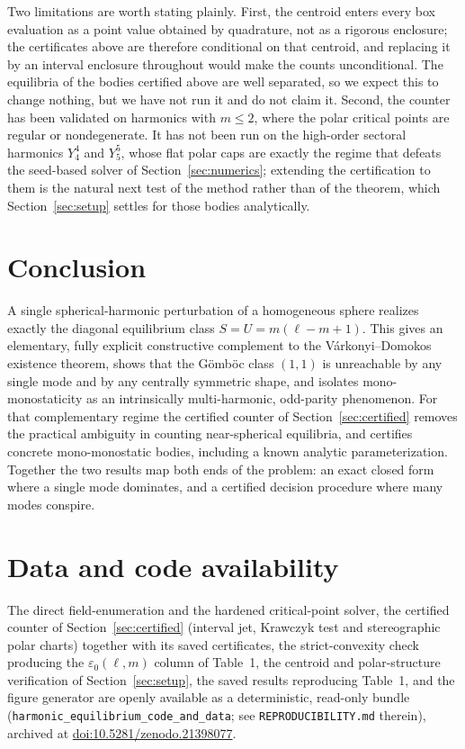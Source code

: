 \documentclass[11pt,a4paper]{article}
\theoremstyle{definition}
\begin{document}
Two limitations are worth stating plainly. First, the centroid enters every box evaluation as a point value
obtained by quadrature, not as a rigorous enclosure; the certificates above are therefore conditional on that
centroid, and replacing it by an interval enclosure throughout would make the counts unconditional. The
equilibria of the bodies certified above are well separated, so we expect this to change nothing, but we have
not run it and do not claim it. Second, the counter has been validated on harmonics with $m\le2$, where the
polar critical points are regular or nondegenerate. It has not been run on the high-order sectoral harmonics
$Y_4^4$ and $Y_5^5$, whose flat polar caps are exactly the regime that defeats the seed-based solver of
Section~\ref{sec:numerics}; extending the certification to them is the natural next test of the method rather
than of the theorem, which Section~\ref{sec:setup} settles for those bodies analytically.

\section{Conclusion}

A single spherical-harmonic perturbation of a homogeneous sphere realizes exactly the diagonal equilibrium
class $S=U=m(\ell-m+1)$. This gives an elementary, fully explicit constructive complement to the
V\'arkonyi--Domokos existence theorem, shows that the G\"omb\"oc class $(1,1)$ is unreachable by any single
mode and by any centrally symmetric shape, and isolates mono-monostaticity as an intrinsically
multi-harmonic, odd-parity phenomenon. For that complementary regime the certified counter of
Section~\ref{sec:certified} removes the practical ambiguity in counting near-spherical equilibria, and
certifies concrete mono-monostatic bodies, including a known analytic parameterization. Together the two
results map both ends of the problem: an exact closed form where a single mode dominates, and a certified
decision procedure where many modes conspire.

\section*{Data and code availability}
The direct field-enumeration and the hardened critical-point solver, the certified counter of
Section~\ref{sec:certified} (interval jet, Krawczyk test and stereographic polar charts) together with its
saved certificates, the strict-convexity check producing the $\varepsilon_0(\ell,m)$ column of Table~1, the
centroid and polar-structure verification of Section~\ref{sec:setup}, the saved results reproducing Table~1,
and the figure generator are openly available as a deterministic, read-only bundle
(\texttt{harmonic\_equilibrium\_code\_and\_data}; see \texttt{REPRODUCIBILITY.md} therein),
archived at \href{https://doi.org/10.5281/zenodo.21398077}{doi:10.5281/zenodo.21398077}.
\end{document}
